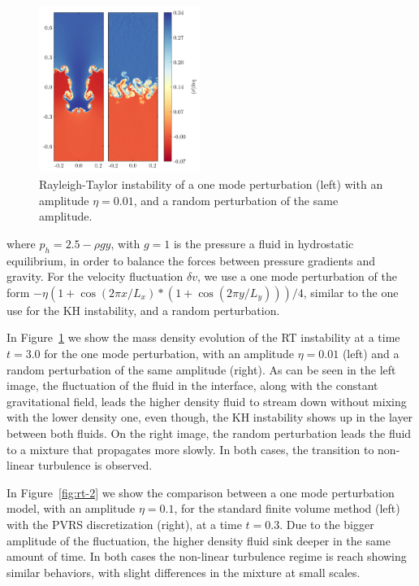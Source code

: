  \begin{figure}
     \centering
     \includegraphics[width=0.47\textwidth]{Figures/rt-comp.png}
     \caption{Rayleigh-Taylor instability of a one mode perturbation (left) with an amplitude $\eta=0.01$, and a random perturbation of the same amplitude.}
     \label{fig:rt-1}
 \end{figure}
 
 \noindent where $p_h = 2.5 - \rho g y$, with $g=1$ is the pressure a fluid in hydrostatic equilibrium, in order to balance the forces between pressure gradients and gravity. For the velocity fluctuation $\delta v$, we use a one mode perturbation of the form $- \eta(1 + \cos(2\pi x/L_x)*(1 + \cos(2 \pi y/ L_y )))/4 $, similar to the one use for the KH instability, and a random perturbation.



 In Figure~\ref{fig:rt-1} we show the mass density evolution of the RT instability at a time $t = 3.0$ for the one mode perturbation, with an amplitude $\eta = 0.01$ (left) and a random perturbation of the same amplitude (right). As can be seen in the left image, the fluctuation of the fluid in the interface, along with the constant gravitational field, leads the higher density fluid to stream down without mixing with the lower density one, even though, the KH instability shows up in the layer between both fluids. On the right image, the random perturbation leads the fluid to a mixture that propagates more slowly. In both cases, the transition to non-linear turbulence is observed.

 In Figure~\ref{fig:rt-2} we show the comparison between a one mode perturbation model, with an amplitude $\eta = 0.1$, for the standard finite volume method (left) with the PVRS discretization (right), at a time $t=0.3$. Due to the bigger amplitude of the fluctuation, the higher density fluid sink deeper in the same amount of time. In both cases the non-linear turbulence regime is reach showing similar behaviors, with slight differences in the mixture at small scales.

